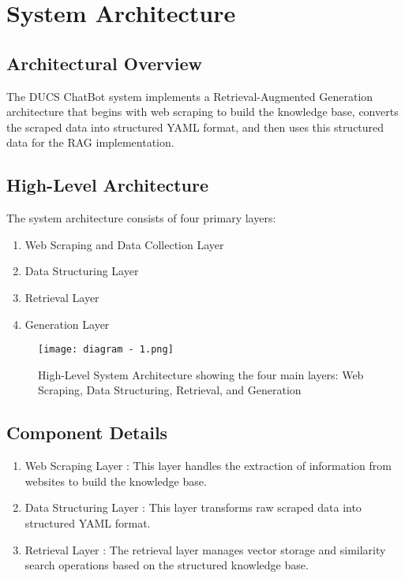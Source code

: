 \documentclass[12pt,a4paper]{report}
\begin{document}
\section{System Architecture}

\subsection{Architectural Overview}
The DUCS ChatBot system implements a Retrieval-Augmented Generation architecture that begins with web scraping to build the knowledge base, converts the scraped data into structured YAML format, and then uses this structured data for the RAG implementation.

\subsection{High-Level Architecture}
The system architecture consists of four primary layers:
\begin{enumerate}
    \item Web Scraping and Data Collection Layer
    \item Data Structuring Layer
    \item Retrieval Layer
    \item Generation Layer
\end{enumerate}

\begin{figure}[htbp]
    \centering
    \texttt{[image: diagram - 1.png]}
    \caption{High-Level System Architecture showing the four main layers: Web Scraping, Data Structuring, Retrieval, and Generation}
    \label{fig:system-architecture}
\end{figure}

\subsection{Component Details}

\begin{enumerate}
    \item Web Scraping Layer : This layer handles the extraction of information from websites to build the knowledge base.
    \item Data Structuring Layer : This layer transforms raw scraped data into structured YAML format.
    \item Retrieval Layer : The retrieval layer manages vector storage and similarity search operations based on the structured knowledge base.
\end{enumerate}
\end{document}
